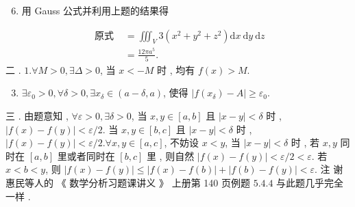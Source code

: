\documentclass[10pt]{article}
\begin{document}
\begin{enumerate}
  \setcounter{enumi}{5}
  \item  用  Gauss  公式并利用上题的结果得 
\end{enumerate}
$$
\begin{aligned}
\text { 原式 } &=\iiint_{V} 3\left(x^{2}+y^{2}+z^{2}\right) \mathrm{d} x \mathrm{~d} y \mathrm{~d} z \\
&=\frac{12 \pi a^{5}}{5} .
\end{aligned}
$$
 二 . $1 . \forall M>0, \exists \Delta>0$,  当  $x<-M$  时 ,  均有  $f(x)>M$.

\begin{enumerate}
  \setcounter{enumi}{2}
  \item $\exists \varepsilon_{0}>0, \forall \delta>0, \exists x_{\delta} \in(a-\delta, a)$,  使得  $\left|f\left(x_{\delta}\right)-A\right| \geqslant \varepsilon_{0}$.
\end{enumerate}
 三 .  由题意知 , $\forall \varepsilon>0, \exists \delta>0$,  当  $x, y \in[a, b]$  且  $|x-y|<\delta$  时 , $|f(x)-f(y)|<\varepsilon / 2$.  当  $x, y \in[b, c]$  且  $|x-y|<\delta$  时 , $|f(x)-f(y)|<\varepsilon / 2 . \forall x, y \in[a, c]$,  不妨设  $x<y$,  当  $|x-y|<\delta$  时 ,  若  $x, y$  同时在  $[a, b]$  里或者同时在  $[b, c]$  里 ,  则自然  $|f(x)-f(y)|<\varepsilon / 2<\varepsilon$.  若  $x<b<y$,  则  $|f(x)-f(y)| \leqslant|f(x)-f(b)|+|f(b)-f(y)|<\varepsilon$.  注   谢惠民等人的 《 数学分析习题课讲义 》 上册第  140  页例题  $5.4 .4$  与此题几乎完全一样 .
\end{document}
